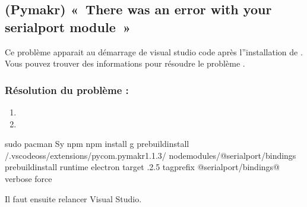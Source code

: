 \documentclass[letterpaper,10pt,french]{sphinxmanual}
\begin{document}
\subsection{(Pymakr) « There was an error with your serialport module »}
\label{\detokenize{AnnexeA:pymakr-there-was-an-error-with-your-serialport-module}}
Ce problème apparait au démarrage de visual studio code après l”installation de . Vous pouvez trouver des informations pour résoudre le problème .


\subsubsection{Résolution du problème :}
\label{\detokenize{AnnexeA:resolution-du-probleme}}\begin{enumerate}
%
\item {} 

\item {} 

\end{enumerate}

\begin{sphinxVerbatim}[commandchars=\\\{\}]
\PYGZdl{} sudo pacman \PYGZhy{}Sy npm
\PYGZdl{} npm install \PYGZhy{}g prebuild\PYGZhy{}install
\PYGZdl{}  \PYGZti{}/.vscode\PYGZhy{}oss/extensions/pycom.pymakr\PYGZhy{}1.1.3/
\PYGZdl{}  node\PYGZus{}modules/@serialport/bindings
\PYGZdl{} prebuild\PYGZhy{}install \PYGZhy{}\PYGZhy{}runtime electron \PYGZhy{}\PYGZhy{}target .2.5 \PYGZhy{}\PYGZhy{}tag\PYGZhy{}prefix @serialport/bindings@ \PYGZhy{}\PYGZhy{}verbose \PYGZhy{}\PYGZhy{}force
\end{sphinxVerbatim}

Il faut ensuite relancer Visual Studio.
\end{document}
